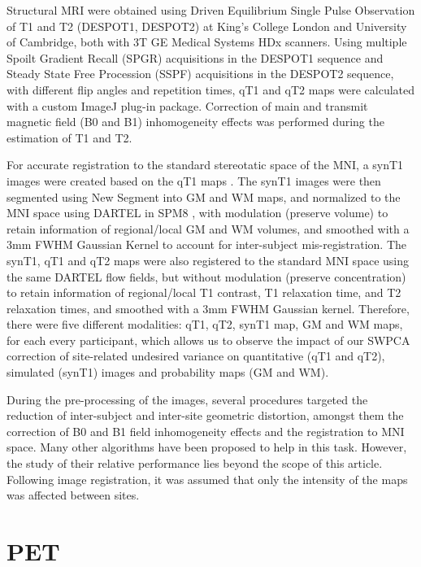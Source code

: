 Structural \ac{MRI} were obtained using Driven Equilibrium Single Pulse Observation of T1 and T2 (DESPOT1, DESPOT2) \cite{deoni2008standardized} at King’s College London and University of Cambridge, both with 3T GE Medical Systems HDx scanners. Using multiple Spoilt Gradient Recall (SPGR) acquisitions in the DESPOT1 sequence and Steady State Free Procession (SSPF) acquisitions in the DESPOT2 sequence, with different flip angles and repetition times, \ac{qT1} and \ac{qT2} maps were calculated with a custom ImageJ plug-in package. Correction of main and transmit magnetic field (B0 and B1) inhomogeneity effects was performed during the estimation of T1 and T2.

For accurate registration to the standard stereotatic space of the \ac{MNI}, a \ac{synT1} images were created based on the \ac{qT1} maps \cite{Ecker2013,Ecker2012,Lai2012}. The \ac{synT1} images were then segmented using New Segment into \ac{GM} and \ac{WM} maps, and normalized to the \ac{MNI} space using DARTEL in SPM8 \cite{spm_book}, with modulation (preserve volume) to retain information of regional/local \ac{GM} and \ac{WM} volumes, and smoothed with a 3mm FWHM Gaussian Kernel to account for inter-subject mis-registration. The \ac{synT1}, \ac{qT1} and \ac{qT2} maps were also registered to the standard \ac{MNI} space using the same DARTEL flow fields, but without modulation (preserve concentration) to retain information of regional/local T1 contrast, T1 relaxation time, and T2 relaxation times, and smoothed with a 3mm FWHM Gaussian kernel. Therefore, there were five different modalities: \ac{qT1}, \ac{qT2}, \ac{synT1} map, \ac{GM} and \ac{WM} maps, for each every participant, which allows us to observe the impact of our \ac{SWPCA} correction of site-related undesired variance on quantitative (\ac{qT1} and \ac{qT2}), simulated (\ac{synT1}) images and probability maps (\ac{GM} and \ac{WM}).
	
During the pre-processing of the images, several procedures targeted the reduction of inter-subject and inter-site geometric distortion, amongst them the correction of B0 and B1 field inhomogeneity effects and the registration to \ac{MNI} space. Many other algorithms have been proposed to help in this task. However, the study of their relative performance lies beyond the scope of this article. Following image registration, it was assumed that only the intensity of the maps was affected between sites.

\section{\acs{PET}}
